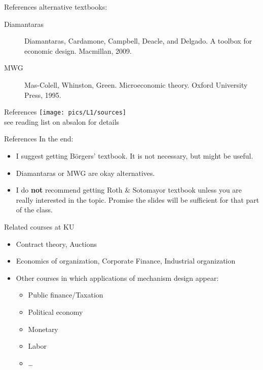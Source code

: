 \documentclass[english,10pt
,aspectratio=169
]{beamer}
\begin{document}
\begin{frame}{References}
	alternative textbooks:
	\begin{description}
		\item[Diamantaras] Diamantaras, Cardamone, Campbell, Deacle, and Delgado. A toolbox for economic design. Macmillan, 2009.
		\item[MWG] Mas-Colell,  Whinston, Green. Microeconomic theory. Oxford University Press, 1995. 
	\end{description}
\end{frame}


\begin{frame}{References}
	\texttt{[image: pics/L1/sources]}
	\\
	see reading list on absalon for details
\end{frame}


\begin{frame}{References}
	In the end:
	\begin{itemize}
		\item I suggest getting B{\"o}rgers' textbook. It is not necessary, but might be useful.
		\item Diamantaras or MWG are okay alternatives.
		\item I do \textbf{not} recommend getting Roth \& Sotomayor textbook unless you are really interested in the topic. Promise the slides will be sufficient for that part of the class.
	\end{itemize}
\end{frame}


\begin{frame}{Related courses at KU}
\begin{itemize}
	\item Contract theory, Auctions
	\item Economics of organization, Corporate Finance, Industrial organization
	\item Other courses in which applications of mechanism design appear:
	\begin{itemize}
		\item Public finance/Taxation
		\item Political economy
		\item Monetary
		\item Labor
		\item \ldots{}
	\end{itemize}
\end{itemize}
\end{frame}
\end{document}
